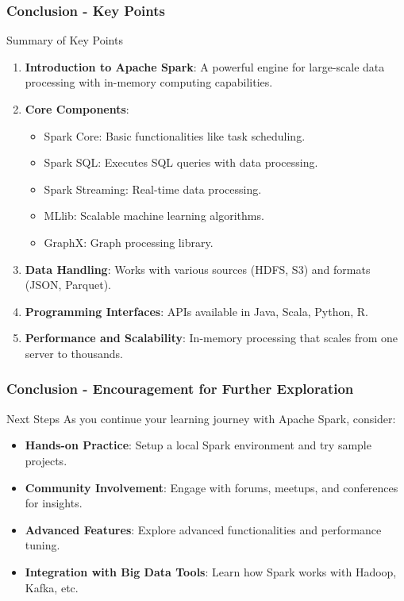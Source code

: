 \documentclass[aspectratio=169]{beamer}
\begin{document}
\begin{frame}[fragile]
    \frametitle{Conclusion - Key Points}
    \begin{block}{Summary of Key Points}
        \begin{enumerate}
            \item \textbf{Introduction to Apache Spark}: A powerful engine for large-scale data processing with in-memory computing capabilities.
            \item \textbf{Core Components}:
                \begin{itemize}
                    \item Spark Core: Basic functionalities like task scheduling.
                    \item Spark SQL: Executes SQL queries with data processing.
                    \item Spark Streaming: Real-time data processing.
                    \item MLlib: Scalable machine learning algorithms.
                    \item GraphX: Graph processing library.
                \end{itemize}
            \item \textbf{Data Handling}: Works with various sources (HDFS, S3) and formats (JSON, Parquet).
            \item \textbf{Programming Interfaces}: APIs available in Java, Scala, Python, R.
            \item \textbf{Performance and Scalability}: In-memory processing that scales from one server to thousands.
        \end{enumerate}
    \end{block}
\end{frame}

\begin{frame}[fragile]
    \frametitle{Conclusion - Encouragement for Further Exploration}
    \begin{block}{Next Steps}
        As you continue your learning journey with Apache Spark, consider:
        \begin{itemize}
            \item \textbf{Hands-on Practice}: Setup a local Spark environment and try sample projects.
            \item \textbf{Community Involvement}: Engage with forums, meetups, and conferences for insights.
            \item \textbf{Advanced Features}: Explore advanced functionalities and performance tuning.
            \item \textbf{Integration with Big Data Tools}: Learn how Spark works with Hadoop, Kafka, etc.
        \end{itemize}
    \end{block}
\end{frame}
\end{document}
